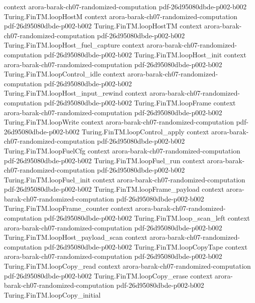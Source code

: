 \begin{theorem}
  {context}
  {arora-barak-ch07-randomized-computation}
  {pdf-26d95080dbde-p002-b002}
\proofstep
  {Turing.FinTM.loopHostM}
  {context}
  {arora-barak-ch07-randomized-computation}
  {pdf-26d95080dbde-p002-b002}
\proofstep
  {Turing.FinTM.loopHostTM}
  {context}
  {arora-barak-ch07-randomized-computation}
  {pdf-26d95080dbde-p002-b002}
\proofstep
  {Turing.FinTM.loopHost_fuel_capture}
  {context}
  {arora-barak-ch07-randomized-computation}
  {pdf-26d95080dbde-p002-b002}
\proofstep
  {Turing.FinTM.loopHost_init}
  {context}
  {arora-barak-ch07-randomized-computation}
  {pdf-26d95080dbde-p002-b002}
\proofstep
  {Turing.FinTM.loopControl_idle}
  {context}
  {arora-barak-ch07-randomized-computation}
  {pdf-26d95080dbde-p002-b002}
\proofstep
  {Turing.FinTM.loopHost_input_rewind}
  {context}
  {arora-barak-ch07-randomized-computation}
  {pdf-26d95080dbde-p002-b002}
\proofstep
  {Turing.FinTM.loopFrame}
  {context}
  {arora-barak-ch07-randomized-computation}
  {pdf-26d95080dbde-p002-b002}
\proofstep
  {Turing.FinTM.loopWrite}
  {context}
  {arora-barak-ch07-randomized-computation}
  {pdf-26d95080dbde-p002-b002}
\proofstep
  {Turing.FinTM.loopControl_apply}
  {context}
  {arora-barak-ch07-randomized-computation}
  {pdf-26d95080dbde-p002-b002}
\proofstep
  {Turing.FinTM.loopFuelCfg}
  {context}
  {arora-barak-ch07-randomized-computation}
  {pdf-26d95080dbde-p002-b002}
\proofstep
  {Turing.FinTM.loopFuel_run}
  {context}
  {arora-barak-ch07-randomized-computation}
  {pdf-26d95080dbde-p002-b002}
\proofstep
  {Turing.FinTM.loopFuel_init}
  {context}
  {arora-barak-ch07-randomized-computation}
  {pdf-26d95080dbde-p002-b002}
\proofstep
  {Turing.FinTM.loopFrame_payload}
  {context}
  {arora-barak-ch07-randomized-computation}
  {pdf-26d95080dbde-p002-b002}
\proofstep
  {Turing.FinTM.loopFrame_counter}
  {context}
  {arora-barak-ch07-randomized-computation}
  {pdf-26d95080dbde-p002-b002}
\proofstep
  {Turing.FinTM.loop_scan_left}
  {context}
  {arora-barak-ch07-randomized-computation}
  {pdf-26d95080dbde-p002-b002}
\proofstep
  {Turing.FinTM.loopHost_payload_scan}
  {context}
  {arora-barak-ch07-randomized-computation}
  {pdf-26d95080dbde-p002-b002}
\proofstep
  {Turing.FinTM.loopCopyTape}
  {context}
  {arora-barak-ch07-randomized-computation}
  {pdf-26d95080dbde-p002-b002}
\proofstep
  {Turing.FinTM.loopCopy_read}
  {context}
  {arora-barak-ch07-randomized-computation}
  {pdf-26d95080dbde-p002-b002}
\proofstep
  {Turing.FinTM.loopCopy_erase}
  {context}
  {arora-barak-ch07-randomized-computation}
  {pdf-26d95080dbde-p002-b002}
\proofstep
  {Turing.FinTM.loopCopy_initial}

\end{theorem}
